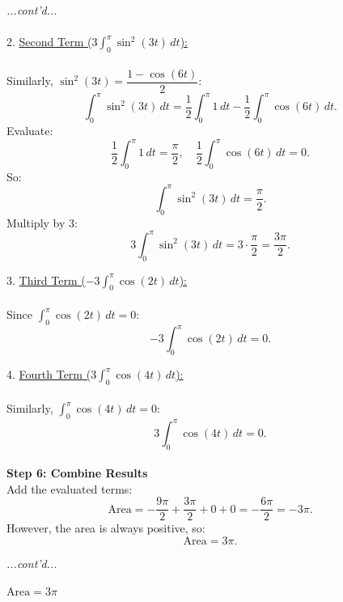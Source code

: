 \documentclass{article}
\begin{document}
\begin{exercisebox}
    \begin{solutionbox}
        \textit{...cont'd...} \\
        \\
        2. \underline{Second Term (\(3\int_{0}^{\pi} \sin^2(3t) \, dt\)):} \\
        \\
       Similarly, \( \sin^2(3t) = \dfrac{1 - \cos(6t)}{2} \):
       \[
           \int_{0}^{\pi} \sin^2(3t) \, dt = \frac{1}{2} \int_{0}^{\pi} 1 \, dt - \frac{1}{2} \int_{0}^{\pi} \cos(6t) \, dt.
       \]
       Evaluate:
       \[
           \frac{1}{2} \int_{0}^{\pi} 1 \, dt = \frac{\pi}{2}, \quad \frac{1}{2} \int_{0}^{\pi} \cos(6t) \, dt = 0.
       \]
       So:
       \[
           \int_{0}^{\pi} \sin^2(3t) \, dt = \frac{\pi}{2}.
       \]
       Multiply by 3:
       \[
           3\int_{0}^{\pi} \sin^2(3t) \, dt = 3 \cdot \frac{\pi}{2} = \frac{3\pi}{2}.
       \]

    3. \underline{Third Term (\(-3\int_{0}^{\pi} \cos(2t) \, dt\)):} \\
    \\
       Since \(\int_{0}^{\pi} \cos(2t) \, dt = 0\):
       \[
           -3\int_{0}^{\pi} \cos(2t) \, dt = 0.
       \]

    4. \underline{Fourth Term (\(3\int_{0}^{\pi} \cos(4t) \, dt\)):} \\
    \\
       Similarly, \(\int_{0}^{\pi} \cos(4t) \, dt = 0\):
       \[
           3\int_{0}^{\pi} \cos(4t) \, dt = 0.
       \]
    \\
    \textbf{Step 6: Combine Results} \\
    Add the evaluated terms:
    \[
        \text{Area} = -\frac{9\pi}{2} + \frac{3\pi}{2} + 0 + 0 = -\frac{6\pi}{2} = -3\pi.
    \]
    However, the area is always positive, so:
    \[
        \text{Area} = 3\pi.
    \]
    \end{solutionbox}
\end{exercisebox}
\begin{exercisebox}
    \begin{solutionbox}
        \textit{...cont'd...}
        \begin{answerbox}
            \( \text{Area} = 3\pi \)
        \end{answerbox}
    \end{solutionbox}
\end{exercisebox}
\end{document}
